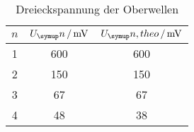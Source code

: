 \begin{table}
  \centering
  \begin{tabular}{c c c}
    \toprule
    $n$ & $U_\su{n}\,/\,\si{\milli\volt}$ & $U_\su{n, theo}\,/\,\si{\milli\volt}$ \\
    \midrule
    1 & 600   &    600  \\
    2 & 150   &    150  \\
    3 & 67    &    67   \\
    4 & 48    &    38   \\
    \bottomrule
  \end{tabular}
  \caption{Dreieckspannung der Oberwellen}
  \label{tab:drei}
\end{table}
